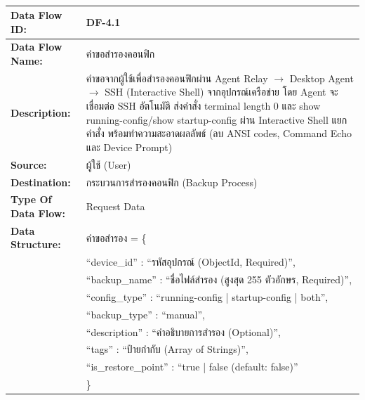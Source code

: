 
\begin{table}[H]
    \caption{}
    \label{tab:df-4-1}
    \fontSixTeen 
    \begin{tabularx}{\textwidth}{|l|L|} 
        \hline
        \textbf{Data Flow ID:} & DF-4.1 \\
        \hline
        \textbf{Data Flow Name:} & คำขอสำรองคอนฟิก \\
        \hline
        \textbf{Description:} & คำขอจากผู้ใช้เพื่อสำรองคอนฟิกผ่าน Agent Relay $\rightarrow$ Desktop Agent $\rightarrow$ SSH (Interactive Shell) จากอุปกรณ์เครือข่าย โดย Agent จะเชื่อมต่อ SSH อัตโนมัติ ส่งคำสั่ง terminal length 0 และ show running-config/show startup-config ผ่าน Interactive Shell แยกคำสั่ง พร้อมทำความสะอาดผลลัพธ์ (ลบ ANSI codes, Command Echo และ Device Prompt) \\
        \hline
        \textbf{Source:} & ผู้ใช้ (User) \\
        \hline
        \textbf{Destination:} & กระบวนการสำรองคอนฟิก (Backup Process) \\
        \hline
        \textbf{Type Of Data Flow:} & Request Data \\
        \hline
        \textbf{Data Structure:} & คำขอสำรอง = \{ \nonumber \\
                        & \hspace{1em} ``device\_id'' : ``รหัสอุปกรณ์ (ObjectId, Required)'', \nonumber \\
                        & \hspace{1em} ``backup\_name'' : ``ชื่อไฟล์สำรอง (สูงสุด 255 ตัวอักษร, Required)'', \nonumber \\
                        & \hspace{1em} ``config\_type'' : ``running-config | startup-config | both'', \nonumber \\
                        & \hspace{1em} ``backup\_type'' : ``manual'', \nonumber \\
                        & \hspace{1em} ``description'' : ``คำอธิบายการสำรอง (Optional)'', \nonumber \\
                        & \hspace{1em} ``tags'' : ``ป้ายกำกับ (Array of Strings)'', \nonumber \\
                        & \hspace{1em} ``is\_restore\_point'' : ``true | false (default: false)'' \nonumber \\
                        & \} \\
        \hline
    \end{tabularx}
\end{table}

